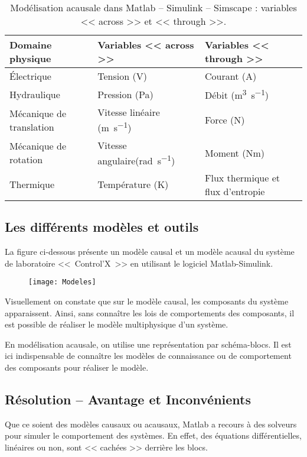 \begin{table*}[h!]
\caption{Modélisation acausale dans Matlab -- Simulink -- Simscape : variables << across >> et << through >>.}
\begin{tabular}{lll}
\midrule
Domaine physique & Variables << across >> &  Variables << through >> \\ \hline
Électrique & Tension (\si{V})& Courant (\si{A})\\ 
Hydraulique & Pression (\si{Pa})& Débit (\si{m^3.s^{-1}})\\ 
Mécanique de translation & Vitesse linéaire (\si{m.s^{-1}})& Force (\si{N})\\ 
Mécanique de rotation & Vitesse angulaire(\si{rad.s^{-1}}) & Moment (\si{Nm})\\ 
Thermique & Température (K)& Flux thermique et flux d'entropie \\ 
\bottomrule
\end{tabular}
\end{table*}

\subsection{Les différents modèles et outils}

La figure ci-dessous présente un modèle causal et un modèle acausal du système de laboratoire <<~Control'X~>> en utilisant le logiciel Matlab-Simulink.

\begin{figure*}[!h]
\texttt{[image: Modeles]}
\end{figure*}

Visuellement on constate que sur le modèle causal, les composants du système apparaissent. Ainsi, sans connaître les lois de comportements des composants, il est possible de réaliser le modèle multiphysique d'un système.

En modélisation acausale, on utilise une représentation par schéma-blocs. Il est ici indispensable de connaître les modèles de connaissance ou de comportement des composants pour réaliser le modèle.

\subsection{Résolution -- Avantage et Inconvénients}

Que ce soient des modèles causaux ou acausaux, Matlab a recours à des solveurs pour simuler le comportement des systèmes. En effet, des équations différentielles, linéaires ou non, sont << cachées >> derrière les blocs.  

